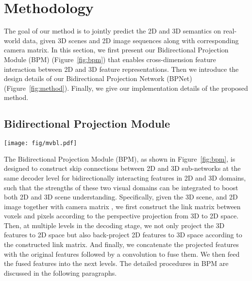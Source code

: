 \documentclass[final]{cvpr}
\begin{document}
 


\section{Methodology}
\label{sec:method}
\vspace{-2mm}


The goal of our method is to jointly predict the 2D and 3D semantics on real-world data, given 3D scenes and 2D image sequences along with corresponding camera matrix. In this section, we first present our Bidirectional Projection Module (BPM) (Figure~\ref{fig:bpm}) that enables cross-dimension feature interaction between 2D and 3D feature representations. Then we introduce the design details of our Bidirectional Projection Network (BPNet) (Figure~\ref{fig:method}). Finally, we give our implementation details of the proposed method.

\vspace{-1mm}
\subsection{Bidirectional Projection Module}
\label{subsec:bpm}
\vspace{-2mm}

\begin{figure*}[!t] 
	\centering
	\texttt{[image: fig/mvbl.pdf]}
\caption{
		Bidirectional Projection Module (BPM). The link matrix construction procedure between one view and the 3D scene is illustrated in (a), and the bidirectional projection procedure is shown in (b).
	 is the camera matrix; the ,  and  voxels are typical examples of three kinds of voxels: voxels that have corresponding pixels under this view, voxels that are occluded by others, and voxels that are out of the view frustum.  and  are features in 2D and 3D spaces, respectively.  and  are the 2D and 3D bidirectionally projected features from the other domain, respectively.
	}
	\vspace{-5mm}
	\label{fig:bpm}
\end{figure*} 


The Bidirectional Projection Module (BPM), as shown in Figure~\ref{fig:bpm}, is designed to construct skip connections between 2D and 3D sub-networks at the same decoder level for bidirectionally interacting features in 2D and 3D domains, such that the strengths of these two visual domains can be integrated to boost both 2D and 3D scene understanding.
Specifically, given the 3D scene, and 2D image together with camera matrix , we first construct the link matrix  between voxels and pixels according to the perspective projection from 3D to 2D space.
Then, at multiple levels in the decoding stage, we not only project the 3D features  to 2D space but also back-project 2D features  to 3D space according to the constructed link matrix.
And finally, we concatenate the projected features with the original features followed by a  convolution to fuse them. We then feed the fused features into the next levels.
The detailed procedures in BPM are discussed in the following paragraphs.
\end{document}
